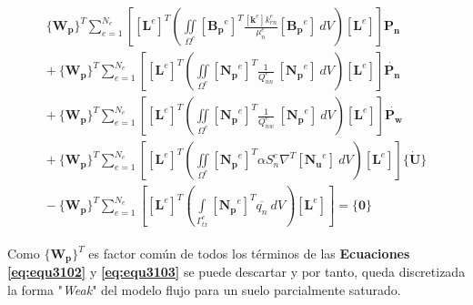 \begin{ceqn} 
\begin{gather}\label{eq:equ3104}
\begin{multlined}
 \{\mathbf{W_p}\}^T  \displaystyle\sum_{e=1}^{N_e} \left[ \left[\mathbf{L}^e\right]^T \left( \iint \limits_{\Omega^e}  [\mathbf{B_p}^e]^T \frac{[\mathbf{k}^e] k_{rn}^e}{\mu_n^e} [\mathbf{B_p}^e]\ dV \right) \left[\mathbf{L}^e\right] \right] \mathbf{P_n}\\[10pt]
+\ \{\mathbf{W_p}\}^T \displaystyle\sum_{e=1}^{N_e} \left[ \left[\mathbf{L}^e\right]^T \left( \iint \limits_{\Omega^e}  [\mathbf{N_p}^e]^T \frac{1}{Q_{nn}^e}\ [\mathbf{N_p}^e]\ dV \right) \left[\mathbf{L}^e\right] \right] \mathbf{\dot{P_{n}}} \\[10pt]
+\ \{\mathbf{W_p}\}^T \displaystyle\sum_{e=1}^{N_e} \left[ \left[\mathbf{L}^e\right]^T \left( \iint \limits_{\Omega^e}  [\mathbf{N_p}^e]^T \frac{1}{Q_{nw}^e}\ [\mathbf{N_p}^e]\ dV \right) \left[\mathbf{L}^e\right] \right] \mathbf{\dot{P_{w}}} \\[10pt]
+\ \{\mathbf{W_p}\}^T \displaystyle\sum_{e=1}^{N_e} \left[ \left[\mathbf{L}^e\right]^T \left( \iint \limits_{\Omega^e}  [\mathbf{N_p}^e]^T  \alpha S_n^e  \nabla^T [\mathbf{N_u}^e]\ dV \right) \left[\mathbf{L}^e\right] \right]\{\mathbf{\dot{U}}\}  \\[10pt]
-\ \{\mathbf{W_p}\}^T \displaystyle\sum_{e=1}^{N_e} \left[ \left[\mathbf{L}^e\right]^T \left(  \int \limits_{\Gamma^e_{tx}} [\mathbf{N_p}^e]^T \overline{q_n}\ dV \right) \left[\mathbf{L}^e\right] \right] = \{\mathbf{0}\}
\end{multlined}
\end{gather}  
\end{ceqn}


Como $\{\mathbf{W_p}\}^T$ es factor común de todos los términos de las \textbf{Ecuaciones} \textbf{\ref{eq:equ3102}} y \textbf{\ref{eq:equ3103}} se puede descartar y por tanto, queda discretizada la forma "\textit{Weak}" del modelo flujo para un suelo parcialmente saturado.\newpage


